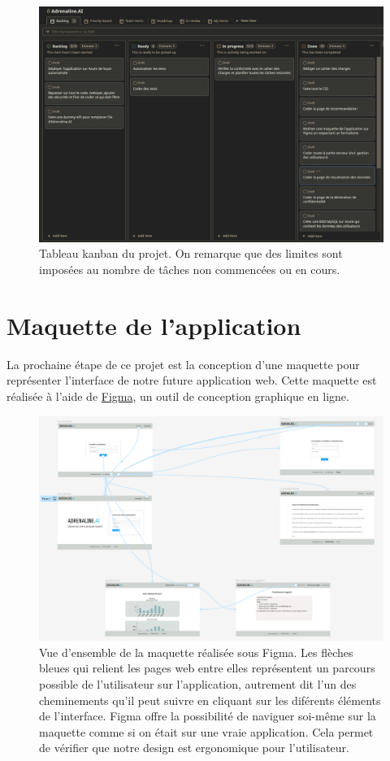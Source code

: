 \documentclass[french]{article}
\begin{document}
    \begin{figure}[h!]
        \includegraphics[width=12cm]{kanban}
        \centering
        \caption{Tableau kanban du projet. On remarque que des limites sont imposées au nombre de tâches non commencées ou en cours.}
        \centering
    \end{figure}

    \section{Maquette de l'application}

    La prochaine étape de ce projet est la conception d'une maquette pour représenter l'interface de notre future application web. Cette maquette est réalisée à l'aide de \href{https://www.figma.com/}{Figma}, un outil de conception graphique en ligne.
    \begin{figure}[h!]
        \includegraphics[width=12cm]{figma}
        \centering
        \caption{Vue d'ensemble de la maquette réalisée sous Figma. Les flèches bleues qui relient les pages web entre elles représentent un parcours possible de l'utilisateur sur l'application, autrement dit l'un des cheminements qu'il peut suivre en cliquant sur les diférents éléments de l'interface. Figma offre la possibilité de naviguer soi-même sur la maquette comme si on était sur une vraie application. Cela permet de vérifier que notre design est ergonomique pour l'utilisateur.}
        \centering
    \end{figure}
\end{document}
